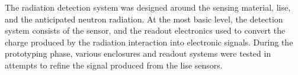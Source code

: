\documentclass[../../../main.tex]{subfiles}%
\begin{document}
%
    \Xsubsection%
    The radiation detection system was designed around the sensing material, \glsdesc{lise}, and the anticipated neutron radiation.
    At the most basic level, the detection system consists of the sensor, and the readout electronics used to convert the charge produced by the radiation interaction into electronic signals.
    During the prototyping phase, various enclosures and readout systems were tested in attempts to refine the signal produced from the \gls{lise} sensors.
\end{document}
